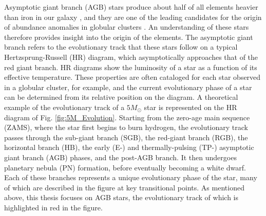 Asymptotic giant branch (AGB) stars produce about half of all elements heavier than iron in our galaxy \cite{Busso1999}, and they are one of the leading candidates for the origin of abundance anomalies in globular clusters \cite{Prantzos2007}. An understanding of these stars therefore provides insight into the origin of the elements. The asymptotic giant branch refers to the evolutionary track that these stars follow on a typical Hertzsprung-Russell (HR) diagram, which asymptotically approaches that of the red giant branch. HR diagrams show the luminosity of a star as a function of its effective temperature. These properties are often cataloged for each star observed in a globular cluster, for example, and the current evolutionary phase of a star can be determined from its relative position on the diagram. A theoretical example of the evolutionary track of a $5 M_{\odot}$ star is represented on the HR diagram of Fig. \ref{fig:5M_Evolution}. Starting from the zero-age main sequence (ZAMS), where the star first begins to burn hydrogen, the evolutionary track passes through the sub-giant branch (SGB), the red-giant branch (RGB), the horizontal branch (HB), the early (E-) and thermally-pulsing (TP-) asymptotic giant branch (AGB) phases, and the post-AGB branch. It then undergoes planetary nebula (PN) formation, before eventually becoming a white dwarf. Each of these branches represents a unique evolutionary phase of the star, many of which are described in the figure at key transitional points. As mentioned above, this thesis focuses on AGB stars, the evolutionary track of which is highlighted in red in the figure.

